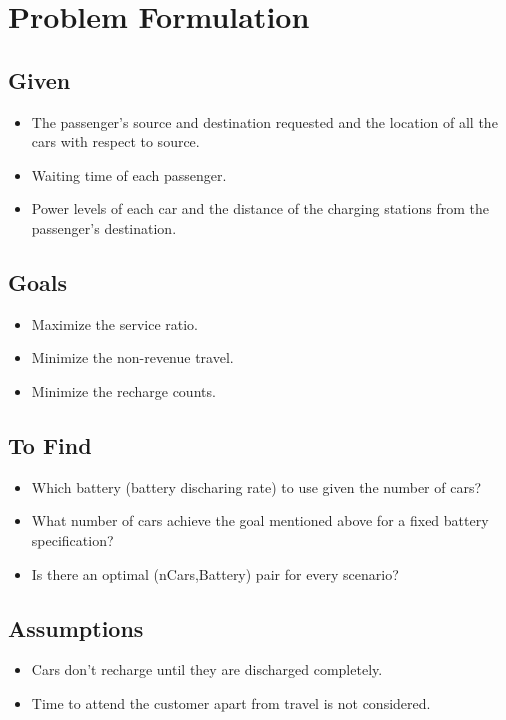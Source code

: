 \documentclass[11pt]{report}
\begin{document}
\section{Problem Formulation}

\subsection{Given}

\begin{itemize}
		\item The passenger’s source and destination requested and the location of all the cars with
			  respect to source. 
		\item Waiting time of each passenger. 
		\item Power levels of each car and the distance of the charging
			  stations from the passenger’s destination.
\end{itemize}


\subsection{Goals}

\begin{itemize}
	\item Maximize the service ratio.
	\item Minimize the non-revenue travel.
	\item Minimize the recharge counts.
\end{itemize}

\subsection{To Find}

\begin{itemize}
	\item Which battery (battery discharing rate) to use given the number of cars? 
	\item What number of cars achieve the goal mentioned above for a fixed
battery specification?
	\item Is there an optimal (nCars,Battery) pair for every scenario?

\end{itemize}

\subsection{Assumptions}
\begin{itemize}
	\item Cars don't recharge until they are discharged completely.
	\item Time to attend the customer apart from travel is not considered.
\end{itemize}
\end{document}
